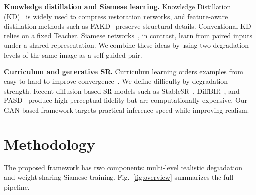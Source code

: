 \documentclass[runningheads]{llncs}
\begin{document}
\noindent\textbf{Knowledge distillation and Siamese learning.}
Knowledge Distillation (KD)~\cite{hinton2015distilling,Hui_2019} is widely used to compress restoration networks, and feature-aware distillation methods such as FAKD~\cite{gao2022featuredistillationinteractionweighting} preserve structural details. Conventional KD relies on a fixed Teacher. Siamese networks~\cite{bromley1993signature,koch2015siamese}, in contrast, learn from paired inputs under a shared representation. We combine these ideas by using two degradation levels of the same image as a self-guided pair.

\noindent\textbf{Curriculum and generative SR.}
Curriculum learning orders examples from easy to hard to improve convergence~\cite{bengio2009curriculum,soviany2022curriculum}. We define difficulty by degradation strength. Recent diffusion-based SR models such as StableSR~\cite{wang2024exploiting}, DiffBIR~\cite{lin2023diffbir}, and PASD~\cite{yang2023pixel} produce high perceptual fidelity but are computationally expensive. Our GAN-based framework targets practical inference speed while improving realism.

\section{Methodology}

The proposed framework has two components: multi-level realistic degradation and weight-sharing Siamese training. Fig.~\ref{fig:overview} summarizes the full pipeline.
\end{document}
